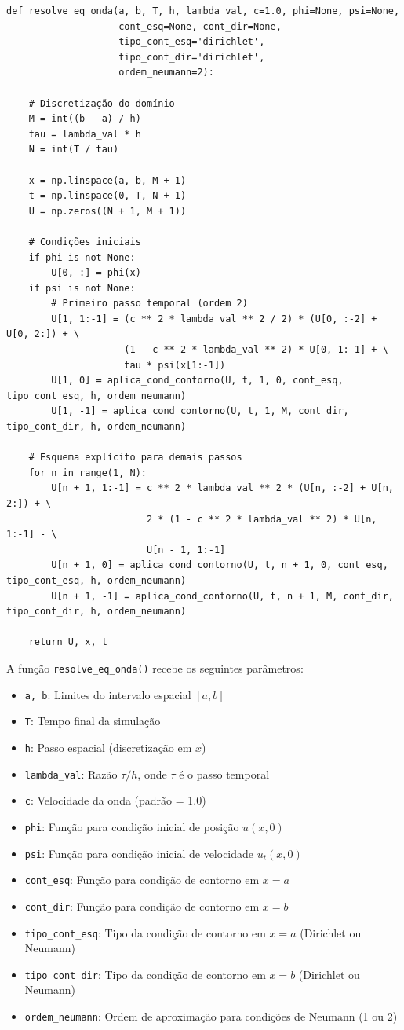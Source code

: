 \documentclass[column,amsmath,amssymb,floatfix]{revtex4}
\begin{document}
\begin{lstlisting}
def resolve_eq_onda(a, b, T, h, lambda_val, c=1.0, phi=None, psi=None,
                    cont_esq=None, cont_dir=None,
                    tipo_cont_esq='dirichlet',
                    tipo_cont_dir='dirichlet',
                    ordem_neumann=2):
                      
    # Discretização do domínio 
    M = int((b - a) / h)
    tau = lambda_val * h
    N = int(T / tau)

    x = np.linspace(a, b, M + 1)
    t = np.linspace(0, T, N + 1)
    U = np.zeros((N + 1, M + 1))

    # Condições iniciais
    if phi is not None:
        U[0, :] = phi(x)
    if psi is not None:
        # Primeiro passo temporal (ordem 2)
        U[1, 1:-1] = (c ** 2 * lambda_val ** 2 / 2) * (U[0, :-2] + U[0, 2:]) + \
                     (1 - c ** 2 * lambda_val ** 2) * U[0, 1:-1] + \
                     tau * psi(x[1:-1])
        U[1, 0] = aplica_cond_contorno(U, t, 1, 0, cont_esq, tipo_cont_esq, h, ordem_neumann)
        U[1, -1] = aplica_cond_contorno(U, t, 1, M, cont_dir, tipo_cont_dir, h, ordem_neumann)

    # Esquema explícito para demais passos
    for n in range(1, N):
        U[n + 1, 1:-1] = c ** 2 * lambda_val ** 2 * (U[n, :-2] + U[n, 2:]) + \
                         2 * (1 - c ** 2 * lambda_val ** 2) * U[n, 1:-1] - \
                         U[n - 1, 1:-1]
        U[n + 1, 0] = aplica_cond_contorno(U, t, n + 1, 0, cont_esq, tipo_cont_esq, h, ordem_neumann)
        U[n + 1, -1] = aplica_cond_contorno(U, t, n + 1, M, cont_dir, tipo_cont_dir, h, ordem_neumann)

    return U, x, t

\end{lstlisting}
A função \texttt{resolve\_eq\_onda()} recebe os seguintes parâmetros:
\begin{itemize}
	\item \texttt{a, b}: Limites do intervalo espacial $[a,b]$
	\item \texttt{T}: Tempo final da simulação
	\item \texttt{h}: Passo espacial (discretização em $x$)
	\item \texttt{lambda\_val}: Razão $\tau/h$, onde $\tau$ é o passo temporal 
	\item \texttt{c}: Velocidade da onda (padrão = 1.0)
	\item \texttt{phi}: Função para condição inicial de posição $u(x,0)$
	\item \texttt{psi}: Função para condição inicial de velocidade $u_t(x,0)$
	\item \texttt{cont\_esq}: Função para condição de contorno em $x=a$
	\item \texttt{cont\_dir}: Função para condição de contorno em $x=b$
	\item \texttt{tipo\_cont\_esq}: Tipo da condição de contorno em $x=a$ (Dirichlet ou Neumann)
	\item \texttt{tipo\_cont\_dir}: Tipo da condição de contorno em $x=b$ (Dirichlet ou Neumann)
	\item \texttt{ordem\_neumann}: Ordem de aproximação para condições de Neumann (1 ou 2)
\end{itemize}
\end{document}
